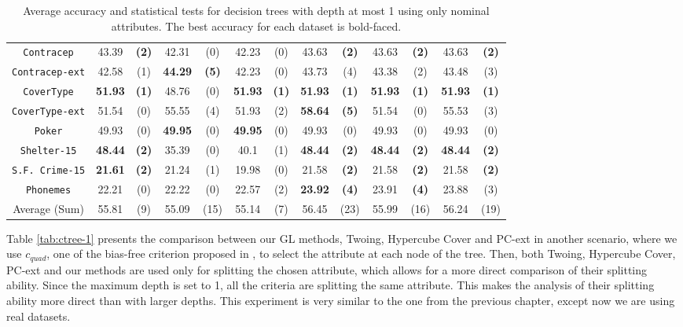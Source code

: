 \begin{table}
\begin{tabular}{c|cc|cc|cc|cc|cc|cc}
{\tt Contracep}     &  43.39       & {\bf (2)}    &  42.31       & (0)          &  42.23       & (0)              & 43.63      & {\bf (2)}     & 43.63      & {\bf (2)}  & 43.63       & {\bf (2)} \\
{\tt Contracep-ext} &  42.58       & (1)          &  {\bf 44.29} & {\bf (5)}    &  42.23       & (0)              & 43.73      & (4)           & 43.38      & (2)        & 43.48       & (3)       \\
{\tt CoverType}     &  {\bf 51.93} & {\bf (1)}    &  48.76       & (0)          & {\bf 51.93}  & {\bf (1)}        &{\bf 51.93} & {\bf (1)}     & {\bf 51.93}& {\bf (1)}  & {\bf 51.93} & {\bf (1)} \\
{\tt CoverType-ext} &  51.54       & (0)          &  55.55       & (4)          &  51.93       & (2)              &{\bf 58.64} & {\bf (5)}     & 51.54      & (0)        & 55.53       & (3)       \\
{\tt Poker}         &  49.93       & (0)          &  {\bf 49.95} & (0)          & {\bf 49.95}  & (0)              & 49.93      & (0)           & 49.93      & (0)        & 49.93       & (0)       \\
{\tt Shelter-15}    &  {\bf 48.44} & {\bf (2)}    &  35.39       & (0)          &  40.1        & (1)              &{\bf 48.44} & {\bf (2)}     & {\bf 48.44}& {\bf (2)}  & {\bf 48.44} & {\bf (2)} \\
{\tt S.F. Crime-15} &  {\bf 21.61} & {\bf (2)}    &  21.24       & (1)          & 19.98        & (0)              & 21.58      & {\bf (2)}     & 21.58      & {\bf (2)}  & 21.58       & {\bf (2)} \\
{\tt Phonemes}      &  22.21       & (0)          &  22.22       & (0)          & 22.57        & (2)              &{\bf 23.92} & {\bf (4)}     & 23.91      & {\bf (4)}  & 23.88       & (3)       \\
\hline
Average (Sum)       &  55.81       & (9)          &  55.09       & (15)         & 55.14        & (7)              &  56.45     & (23)          & 55.99      & (16)       & 56.24       & (19)
\end{tabular}
\normalsize
\caption{Average accuracy and statistical tests  for  decision trees with depth at most 1 using only nominal attributes. The best accuracy for each dataset is bold-faced.}
\label{tab:nominal-1}
\end{table}

Table \ref{tab:ctree-1} presents the 
comparison between our GL methods, Twoing, Hypercube Cover and PC-ext in another scenario,
where we use $c_{quad}$, one of the bias-free criterion proposed in \cite{Hothorn:2006:URP}, to select the attribute at each node of the tree. 
Then, both Twoing, Hypercube Cover, PC-ext and our methods are  used only for splitting the chosen attribute, which allows for a  more direct comparison of their splitting ability. Since the maximum depth is set to 1, all the criteria are splitting the same attribute. This makes the analysis of their splitting ability more direct than with larger depths. This experiment is very similar to the one from the previous chapter, except now we are using real datasets.

